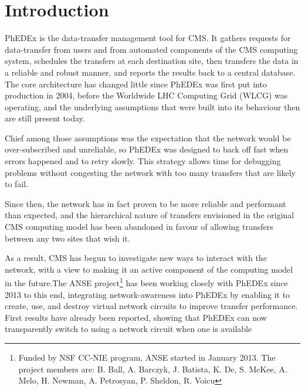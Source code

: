 \section{Introduction}

PhEDEx\cite{PhEDEx} is the data-transfer management tool for CMS. It gathers requests for data-transfer from users and from automated components of the CMS computing system, schedules the transfers at each destination site, then transfers the data in a reliable and robust manner, and reports the results back to a central database. The core architecture has changed little since PhEDEx was first put into production in 2004, before the Worldwide LHC Computing Grid (WLCG\cite{WLCG}) was operating, and the underlying assumptions that were built into its behaviour then are still present today.

Chief among those assumptions was the expectation that the network would be over-subscribed and unreliable, so PhEDEx was designed to back off fast when errors happened and to retry slowly. This strategy allows time for debugging problems without congesting the network with too many transfers that are likely to fail.

Since then, the network has in fact proven to be more reliable and performant than expected, and the hierarchical nature of transfers envisioned in the original CMS computing model\cite{CompModel} has been abandoned in favour of allowing transfers between any two sites that wish it\cite{T2Traffic}.

As a result, CMS has begun to investigate new ways to interact with the network, with a view to making it an active component of the computing model in the future\cite{NetworkAwarenessinCMS}.The ANSE project\cite{ANSE}\footnote{Funded by NSF CC-NIE program, ANSE started in January 2013. The project members are: B. Ball, A. Barczyk, J. Batista, K. De, S. McKee, A. Melo, H. Newman, A. Petrosyan, P. Sheldon, R. Voicu} has been working closely with PhEDEx since 2013 to this end, integrating network-awareness into PhEDEx by enabling it to create, use, and destroy virtual network circuits to improve transfer performance. First results have already been reported, showing that PhEDEx can now transparently switch to using a network circuit when one is available\cite{ANSE_ISGC_2014}